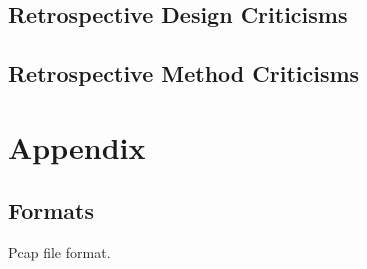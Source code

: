 \documentclass[10pt,a4paper,notitlepage,twoside]{report}
\begin{document}
\section{Retrospective Design Criticisms}

\section{Retrospective Method Criticisms}


\chapter{Appendix}
\section{Formats}
Pcap file format.


\end{document}
